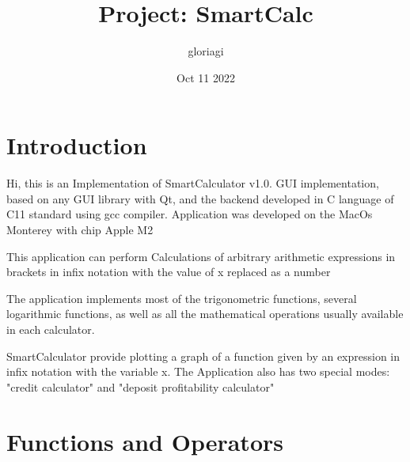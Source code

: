 \documentclass[14pt, a4paper]{article}
\begin{document}
\title{Project: SmartCalc}
\author{gloriagi}
\date{Oct 11 2022} 

\maketitle{}

\pagebreak

\section{Introduction}

Hi, this is an Implementation of SmartCalculator v1.0. GUI implementation, based on any GUI library with Qt, and the backend developed in C language
of C11 standard using gcc compiler. Application was developed on the MacOs Monterey with chip Apple M2

This application can perform Calculations of arbitrary arithmetic expressions in brackets 
in infix notation with the value of x replaced as a number

The application implements most of the trigonometric functions, several logarithmic functions, 
as well as all the mathematical operations 
usually available in each calculator. 

SmartCalculator provide plotting a graph of a function given by an expression in infix notation with the variable x.
The Application also has two special modes: "credit calculator" and "deposit profitability calculator"

\pagebreak

\section{Functions and Operators}
\end{document}
